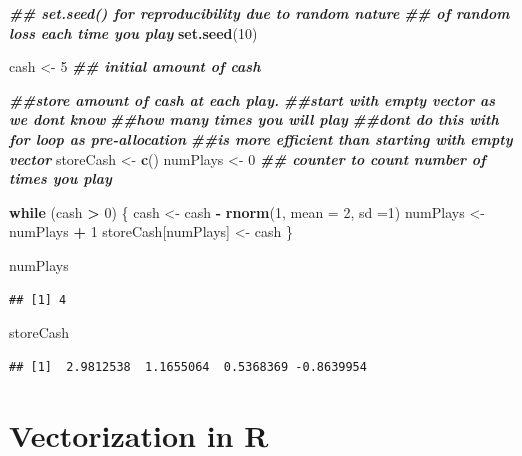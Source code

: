 \documentclass[
]{book}
\newenvironment{Shaded}{\begin{snugshade}}{\end{snugshade}}
\newcommand{\AttributeTok}[1]{\textcolor[rgb]{0.13,0.29,0.53}{#1}}
\newcommand{\ControlFlowTok}[1]{\textcolor[rgb]{0.13,0.29,0.53}{\textbf{#1}}}
\newcommand{\DecValTok}[1]{\textcolor[rgb]{0.00,0.00,0.81}{#1}}
\newcommand{\DocumentationTok}[1]{\textcolor[rgb]{0.56,0.35,0.01}{\textbf{\textit{#1}}}}
\newcommand{\FunctionTok}[1]{\textcolor[rgb]{0.13,0.29,0.53}{\textbf{#1}}}
\newcommand{\NormalTok}[1]{#1}
\newcommand{\OtherTok}[1]{\textcolor[rgb]{0.56,0.35,0.01}{#1}}
\newcommand{\SpecialCharTok}[1]{\textcolor[rgb]{0.81,0.36,0.00}{\textbf{#1}}}
\theoremstyle{definition}
\theoremstyle{definition}
\theoremstyle{definition}
\theoremstyle{definition}
\theoremstyle{remark}
\begin{document}
\begin{Shaded}
\begin{Highlighting}[]
\DocumentationTok{\#\# set.seed() for reproducibility due to random nature }
\DocumentationTok{\#\# of random loss each time you play}
\FunctionTok{set.seed}\NormalTok{(}\DecValTok{10}\NormalTok{) }

\NormalTok{cash }\OtherTok{\textless{}{-}} \DecValTok{5} \DocumentationTok{\#\# initial amount of cash}

\DocumentationTok{\#\#store amount of cash at each play. }
\DocumentationTok{\#\#start with empty vector as we don\textquotesingle{}t know}
\DocumentationTok{\#\#how many times you will play}
\DocumentationTok{\#\#don\textquotesingle{}t do this with for loop as pre{-}allocation}
\DocumentationTok{\#\#is more efficient than starting with empty vector}
\NormalTok{storeCash }\OtherTok{\textless{}{-}} \FunctionTok{c}\NormalTok{()}
\NormalTok{numPlays }\OtherTok{\textless{}{-}} \DecValTok{0} \DocumentationTok{\#\# counter to count number of times you play}

\ControlFlowTok{while}\NormalTok{ (cash }\SpecialCharTok{\textgreater{}} \DecValTok{0}\NormalTok{) \{}
\NormalTok{  cash }\OtherTok{\textless{}{-}}\NormalTok{ cash }\SpecialCharTok{{-}} \FunctionTok{rnorm}\NormalTok{(}\DecValTok{1}\NormalTok{, }\AttributeTok{mean =} \DecValTok{2}\NormalTok{, }\AttributeTok{sd =}\DecValTok{1}\NormalTok{)}
\NormalTok{  numPlays }\OtherTok{\textless{}{-}}\NormalTok{ numPlays }\SpecialCharTok{+} \DecValTok{1}
\NormalTok{  storeCash[numPlays] }\OtherTok{\textless{}{-}}\NormalTok{ cash}
\NormalTok{\}}

\NormalTok{numPlays}
\end{Highlighting}
\end{Shaded}

\begin{verbatim}
## [1] 4
\end{verbatim}

\begin{Shaded}
\begin{Highlighting}[]
\NormalTok{storeCash}
\end{Highlighting}
\end{Shaded}

\begin{verbatim}
## [1]  2.9812538  1.1655064  0.5368369 -0.8639954
\end{verbatim}

\hypertarget{vectorization}{%
\section{Vectorization in R}\label{vectorization}}
\end{document}
